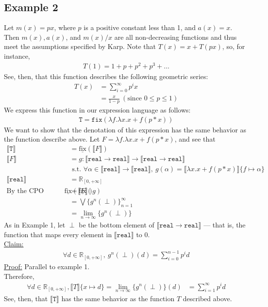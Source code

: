 \documentclass{westhesis}
\theoremstyle{plain}
\theoremstyle{definition}
\newcommand{\R}{\mathbb{R}}
\begin{document}
\subsection{Example 2}
Let $m(x) = px$, where $p$ is a positive constant less than 1, and $a(x) = x$. Then $m(x), a(x)$, and $m(x)/x$ are all non-decreasing functions and thus meet the assumptions specified by Karp. Note that $T(x) = x + T(px)$, so, for instance,
\begin{align*}
T(1) = 1 + p + p^2 + p^3 + \ldots
\end{align*}
See, then, that this function describes the following geometric series:
\begin{align*}
T(x) &= \sum_{i=0}^{\infty} p^ix \\ 
&= \frac{x}{1 - p} \ (\text{since } 0 \leq p \leq 1)
\end{align*}
We express this function in our expression language as follows:
\begin{align*}
 \texttt{T} = \texttt{fix}(\lambda f. \lambda x.x + f (p * x))
 \end{align*}
We want to show that the denotation of this expression has the same behavior as the function describe above. Let $F = \lambda f. \lambda x.x + f (p * x)$, and see that 
 \begin{align*}
 \llbracket \texttt{T} \rrbracket &= \underline{\text{fix}}(\llbracket F \rrbracket) \\
 \llbracket F \rrbracket &= g : \llbracket \texttt{real} \rightarrow \texttt{real}\rrbracket \rightarrow \llbracket \texttt{real} \rightarrow \texttt{real}\rrbracket \\ &\text{ \ \ \ s.t. } \forall \alpha \in \llbracket \texttt{real}\rrbracket \rightarrow \llbracket \texttt{real}\rrbracket, \ 
 g(\alpha) = \llbracket \lambda x.x + f (p * x)\rrbracket\{f \mapsto \alpha\} \\
 \llbracket \texttt{real}\rrbracket &= \R_{[0, +\infty]}  
 \\\text{By the CPO fixpoint theorem, } \underline{\text{fix}}(\llbracket F \rrbracket) &= \underline{\text{fix}}(g) \\
&= \bigvee\{g^n (\perp)\}^{\infty}_{n=1} \\
&= \lim_{n \to \infty}\{g^n (\perp)\}
 \end{align*}
As in Example 1, let $\perp$ be the bottom element of $\llbracket \texttt{real} \rightarrow \texttt{real} \rrbracket$ --- that is, 
the function that maps every element in $\llbracket \texttt{real} \rrbracket$ to $0$. \\
 \underline{Claim:}
 \begin{align*}
 \forall d \in \R_{[0, +\infty]}, \ g^n(\perp)(d) = \sum_{i = 0}^{n-1}p^{i}d
 \end{align*}
 \underline{Proof:} Parallel to example 1. \\
Therefore, 
 \begin{align*}
 \forall d \in \R_{[0,+\infty]}, \llbracket T \rrbracket\{x \mapsto d \} =  \lim_{n \to \infty}\{g^n (\perp)\}(d) &= \sum_{i=1}^{\infty} 
 p^{i}d 
 \end{align*}
 See, then, that $\llbracket \texttt{T} \rrbracket$ has the same behavior as the function $T$ described above.
\end{document}
